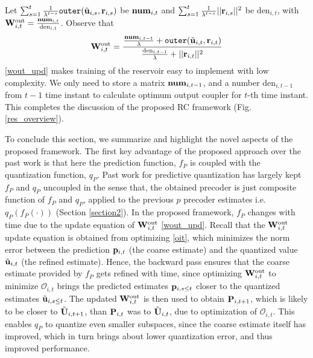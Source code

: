 \documentclass[conference]{IEEEtran}
\begin{document}
{Let $\sum_{s=1}^{t}\frac{1}{\lambda^{t-s}}\texttt{outer}(\tilde{{\bf u}}_{i,s},{\bf r}_{i,s})$ be $\text{\textbf{num}}_{i,t}$ and $\sum_{s=1}^{t}\frac{1}{\lambda^{t-s}}||{\bf r}_{i,s}||^2$ be $\text{den}_{i,t}$, with ${\bf W}_{i,t}^{\text{out}}=\frac{\text{\textbf{num}}_{i,t}}{\text{den}_{i,t}}$.
Observe that
\begin{equation}
\bW_{i,t}^{\text{out}}=\frac{\frac{\text{\textbf{num}}_{i,t-1}}{\lambda}+\texttt{outer}(\tilde{\bu}_{i,t},\br_{i,t})}{\frac{\text{den}_{i,t-1}}{\lambda}+||\br_{i,t}||^2}
\label{wout_upd}
\end{equation}
\eqref{wout_upd} makes training of the reservoir easy to implement with low complexity.
We only need to store a matrix $\text{\textbf{num}}_{i,t-1}$, and a number $\text{den}_{i,t-1}$ from $t-1$ time instant to calculate optimum output coupler for $t$-th time instant. This completes the discussion of the proposed RC framework (Fig. \ref{res_overview}).

To conclude this section, we summarize and highlight the novel aspects
of the proposed framework.  The first key advantage of the proposed
approach over the past work \cite{6891198,6545375} is that here the
prediction function, $f_P$ is coupled with the quantization function,
$q_P$.  Past work for predictive quantization has largely kept $f_P$
and $q_P$ uncoupled in the sense that, the obtained precoder is just
composite function of $f_P$ and $q_P$, applied to the previous $p$
precoder estimates i.e. $q_P(f_P(\cdot))$ (Section \ref{section2}). In
the proposed framework, $f_P$ changes with time due to the update
equation of ${\bf W}_{i,t}^{\text{out}}$ \eqref{wout_upd}. Recall that the
${\bf W}_{i,t}^{\text{out}}$ update equation is obtained from optimizing
\eqref{oit}, which minimizes the norm error between the prediction
${\bf p}_{i,t}$ (the coarse estimate) and the quantized value
$\tilde{{\bf u}}_{i,t}$ (the refined estimate). Hence, the backward pass
ensures that the coarse estimate provided by $f_P$ gets refined with
time, since optimizing ${\bf W}_{i,t}^{\text{out}}$ to minimize
$\mathcal{O}_{i,t}$ brings the predicted estimates ${\bf p}_{i,s\leq t}$
closer to the quantized estimates $\tilde{{\bf u}}_{i,s\leq t}$.  The
updated ${\bf W}_{i,t}^{\text{out}}$ is then used to obtain ${\bf P}_{i,t+1}$,
which is likely to be closer to $\tilde{{\bf U}}_{i,t+1}$, than
${\bf P}_{i,t}$ was to $\tilde{{\bf U}}_{i,t}$, due to optimization of
$\mathcal{O}_{i,t}$.  This enables $q_P$ to quantize even smaller
subspaces, since the coarse estimate itself has improved, which in
turn brings about lower quantization error, and thus improved
performance.

}
\end{document}

